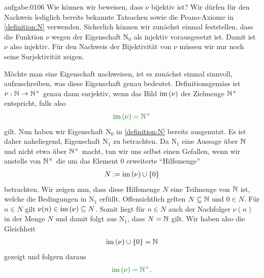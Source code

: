 \begin{antwort}{aufgabe:0106}
Wie können wir beweisen, dass $\nu$ bijektiv ist? Wir dürfen für den Nachweis lediglich bereits bekannte Tatsachen sowie die Peano-Axiome in \cref{definition:N} verwenden. Sicherlich können wir zunächst einmal feststellen, dass die Funktion $\nu$ wegen der Eigenschaft N$_0$ als injektiv vorausgesetzt ist. Damit ist $\nu$ also injektiv. Für den Nachweis der Bijektivität von $\nu$ müssen wir nur noch seine Surjektivität zeigen.

Möchte man eine Eigenschaft nachweisen, ist es zunächst einmal sinnvoll, aufzuschreiben, was diese Eigenschaft genau bedeutet. Definitionsgemäss ist $\nu:\mathbb{N}\to\mathbb{N}^{\times}$ genau dann surjektiv, wenn das Bild $\text{im}\left(\nu\right)$ der Zielmenge $\mathbb{N}^{\times}$ entspricht, falls also
\begin{align*}
    \textcolor{DarkGreen}{\text{im}\lr{\nu} = \Nunit}
\end{align*}
gilt. Nun haben wir Eigenschaft N$_0$ in \cref{definition:N} bereits ausgenutzt. Es ist daher naheliegend, Eigenschaft N$_1$ zu betrachten. Da N$_1$ eine Aussage über $\mathbb{N}$ und nicht etwa über $\mathbb{N}^{\times}$ macht, tun wir uns selbst einen Gefallen, wenn wir anstelle von $\mathbb{N}^{\times}$ die um das Element $0$ erweiterte \enquote{Hilfsmenge}
\begin{align*}
    N := \text{im}\left(\nu\right) \cup \left\{0\right\}
\end{align*}
betrachten. Wir zeigen nun, dass diese Hilfsmenge $N$ eine Teilmenge von $\mathbb{N}$ ist, welche die Bedingungen in N$_1$ erfüllt. Offensichtlich gelten $N\subseteq \mathbb{N}$ und $0\in N$. Für $n\in N$ gilt $\nu(n)\in\text{im}\left(\nu\right)\subseteq N$. Somit liegt für $n\in N$ auch der Nachfolger $\nu(n)$ in der Menge $N$ und damit folgt aus N$_1$, dass $N = \mathbb{N}$ gilt. Wir haben also die Gleichheit
\begin{align*}
    \text{im}\left(\nu\right) \cup \left\{0\right\} = \mathbb{N}
\end{align*}
gezeigt und folgern daraus
\begin{align*}
    \textcolor{DarkGreen}{\text{im}\lr{\nu} = \Nunit}.
\end{align*}
\end{antwort}

\clearpage
\shipoutAnswer